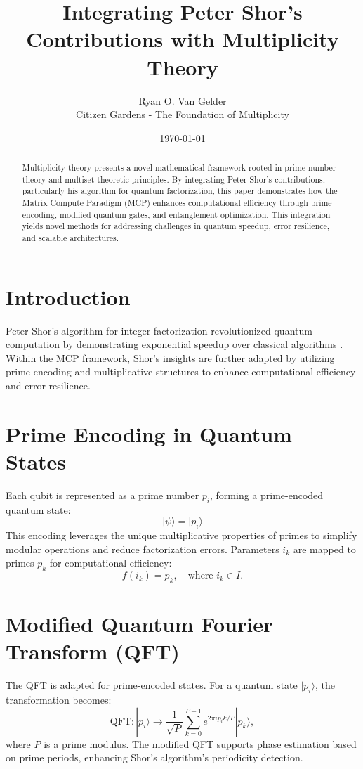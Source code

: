 \documentclass{article}
\theoremstyle{plain}
\begin{document}
\title{Integrating Peter Shor's Contributions with Multiplicity Theory}
\author{Ryan O. Van Gelder \\ Citizen Gardens - The Foundation of Multiplicity}
\date{\today}
\maketitle

\begin{abstract}
Multiplicity theory presents a novel mathematical framework rooted in prime number theory and multiset-theoretic principles. By integrating Peter Shor's contributions, particularly his algorithm for quantum factorization, this paper demonstrates how the Matrix Compute Paradigm (MCP) enhances computational efficiency through prime encoding, modified quantum gates, and entanglement optimization. This integration yields novel methods for addressing challenges in quantum speedup, error resilience, and scalable architectures.
\end{abstract}

\section{Introduction}
Peter Shor's algorithm for integer factorization revolutionized quantum computation by demonstrating exponential speedup over classical algorithms \cite{shor1994algorithms, shor1997polynomial}. Within the MCP framework, Shor’s insights are further adapted by utilizing prime encoding and multiplicative structures to enhance computational efficiency and error resilience.

\section{Prime Encoding in Quantum States}
Each qubit is represented as a prime number $p_i$, forming a prime-encoded quantum state:
\begin{equation}
|\psi\rangle = |p_i\rangle
\end{equation}
This encoding leverages the unique multiplicative properties of primes to simplify modular operations and reduce factorization errors. Parameters $i_k$ are mapped to primes $p_k$ for computational efficiency:
\begin{equation}
f(i_k) = p_k, \quad \text{where } i_k \in I.
\end{equation}

\section{Modified Quantum Fourier Transform (QFT)}
The QFT is adapted for prime-encoded states. For a quantum state $|p_i\rangle$, the transformation becomes:
\begin{equation}
\text{QFT}: |p_i\rangle \to \frac{1}{\sqrt{P}} \sum_{k=0}^{P-1} e^{2\pi i p_i k / P} |p_k\rangle,
\end{equation}
where $P$ is a prime modulus. The modified QFT supports phase estimation based on prime periods, enhancing Shor's algorithm's periodicity detection.
\end{document}
